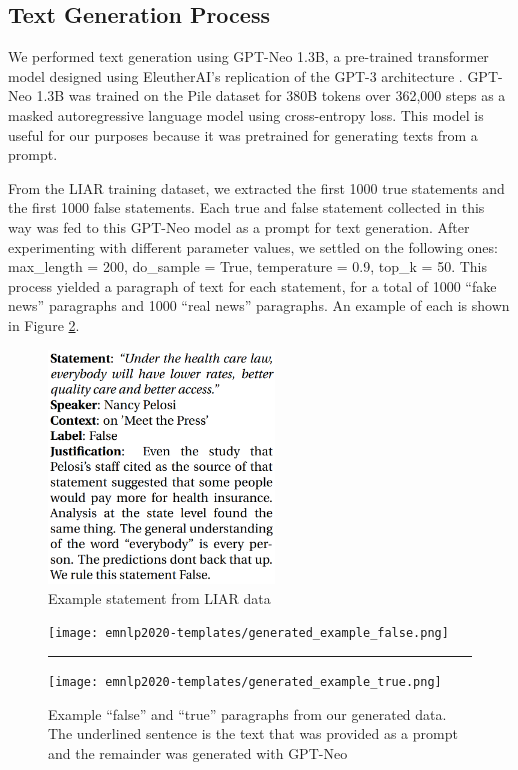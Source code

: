 \documentclass[11pt,a4paper]{article}
\begin{document}
\subsection{Text Generation Process}
We performed text generation using GPT-Neo 1.3B, a pre-trained transformer model designed using EleutherAI's replication of the GPT-3 architecture \citep{gpt-neo}. GPT-Neo 1.3B was trained on the Pile dataset \citep{gao2020pile} for 380B tokens over 362,000 steps as a masked autoregressive language model using cross-entropy loss. This model is useful for our purposes because it was pretrained for generating texts from a prompt. 

From the LIAR training dataset, we extracted the first 1000 true statements and the first 1000 false statements. Each true and false statement collected in this way was fed to this GPT-Neo model as a prompt for text generation. After experimenting with different parameter values, we settled on the following ones: max\_length = 200, do\_sample = True, temperature = 0.9, top\_k = 50. This process yielded a paragraph of text for each statement, for a total of 1000 ``fake news'' paragraphs and 1000 ``real news'' paragraphs. An example of each is shown in Figure \ref{fig:generated_examples}. 

\begin{figure}
    \centering
    \includegraphics[width=6cm]{LIARexample.png}
    \caption{Example statement from LIAR data \citep{wang2017liar}}
    \label{fig:LIAR_example}
\end{figure}

\begin{figure}
    \centering
    \texttt{[image: emnlp2020-templates/generated\_example\_false.png]}
    \par\noindent\rule[1pt]{7cm}{0.4pt}
    \texttt{[image: emnlp2020-templates/generated\_example\_true.png]}
    \caption{Example ``false'' and ``true'' paragraphs from our generated data. The underlined sentence is the text that was provided as a prompt and the remainder was generated with GPT-Neo}
    \label{fig:generated_examples}
\end{figure}
\end{document}
